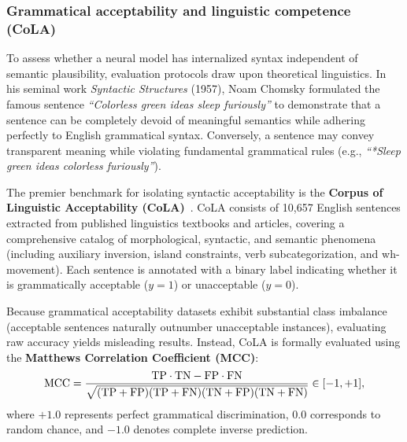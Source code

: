 \documentclass[../../main.tex]{subfiles}
\begin{document}
\subsubsection{Grammatical acceptability and linguistic competence (CoLA)}
\label{subsec:nli_grammatical_acceptability}
To assess whether a neural model has internalized syntax independent of semantic plausibility, evaluation protocols draw upon theoretical linguistics. In his seminal work \textit{Syntactic Structures} (1957), Noam Chomsky formulated the famous sentence \textit{``Colorless green ideas sleep furiously''} to demonstrate that a sentence can be completely devoid of meaningful semantics while adhering perfectly to English grammatical syntax. Conversely, a sentence may convey transparent meaning while violating fundamental grammatical rules (e.g., \textit{``*Sleep green ideas colorless furiously''}).

The premier benchmark for isolating syntactic acceptability is the \textbf{Corpus of Linguistic Acceptability (CoLA)}~\cite{warstadt2019cola}. CoLA consists of 10,657 English sentences extracted from published linguistics textbooks and articles, covering a comprehensive catalog of morphological, syntactic, and semantic phenomena (including auxiliary inversion, island constraints, verb subcategorization, and wh-movement). Each sentence is annotated with a binary label indicating whether it is grammatically acceptable ($y = 1$) or unacceptable ($y = 0$).

Because grammatical acceptability datasets exhibit substantial class imbalance (acceptable sentences naturally outnumber unacceptable instances), evaluating raw accuracy yields misleading results. Instead, CoLA is formally evaluated using the \textbf{Matthews Correlation Coefficient (MCC)}:
\begin{equation}
\label{eq:mcc_def}
\text{MCC} = \frac{\mathrm{TP} \cdot \mathrm{TN} - \mathrm{FP} \cdot \mathrm{FN}}{\sqrt{(\mathrm{TP} + \mathrm{FP})(\mathrm{TP} + \mathrm{FN})(\mathrm{TN} + \mathrm{FP})(\mathrm{TN} + \mathrm{FN})}} \in [-1, +1],
\end{equation}
where $+1.0$ represents perfect grammatical discrimination, $0.0$ corresponds to random chance, and $-1.0$ denotes complete inverse prediction.
\end{document}
